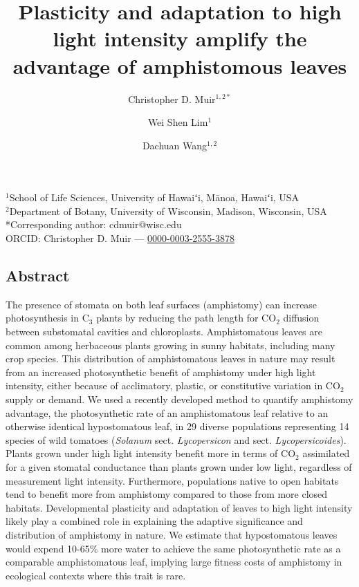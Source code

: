 \documentclass[
  letterpaper,
  DIV=11,
  numbers=noendperiod]{scrartcl}
\title{Plasticity and adaptation to high light intensity amplify the
advantage of amphistomous leaves}
\author{Christopher D. Muir\(^{1,2*}\) \and Wei Shen
Lim\(^{1}\) \and Dachuan Wang\(^{1,2}\)}
\date{}
\begin{document}
\maketitle


\begin{center}
$^1$School of Life Sciences, University of Hawaiʻi, Mānoa, Hawaiʻi, USA\\
$^2$Department of Botany, University of Wisconsin, Madison, Wisconsin, USA\\
\medskip
*Corresponding author: cdmuir@wisc.edu\\
\medskip
ORCID: Christopher D. Muir — \href{https://orcid.org/0000-0003-2555-3878}{0000-0003-2555-3878}\\
\end{center}

\subsection{Abstract}\label{abstract}

The presence of stomata on both leaf surfaces (amphistomy) can increase
photosynthesis in C\(_3\) plants by reducing the path length for
CO\(_2\) diffusion between substomatal cavities and chloroplasts.
Amphistomatous leaves are common among herbaceous plants growing in
sunny habitats, including many crop species. This distribution of
amphistomatous leaves in nature may result from an increased
photosynthetic benefit of amphistomy under high light intensity, either
because of acclimatory, plastic, or constitutive variation in CO\(_2\)
supply or demand. We used a recently developed method to quantify
amphistomy advantage, the photosynthetic rate of an amphistomatous leaf
relative to an otherwise identical hypostomatous leaf, in 29 diverse
populations representing 14 species of wild tomatoes (\emph{Solanum}
sect. \emph{Lycopersicon} and sect. \emph{Lycopersicoides}). Plants
grown under high light intensity benefit more in terms of CO\(_2\)
assimilated for a given stomatal conductance than plants grown under low
light, regardless of measurement light intensity. Furthermore,
populations native to open habitats tend to benefit more from amphistomy
compared to those from more closed habitats. Developmental plasticity
and adaptation of leaves to high light intensity likely play a combined
role in explaining the adaptive significance and distribution of
amphistomy in nature. We estimate that hypostomatous leaves would expend
10-65\% more water to achieve the same photosynthetic rate as a
comparable amphistomatous leaf, implying large fitness costs of
amphistomy in ecological contexts where this trait is rare.
\end{document}
